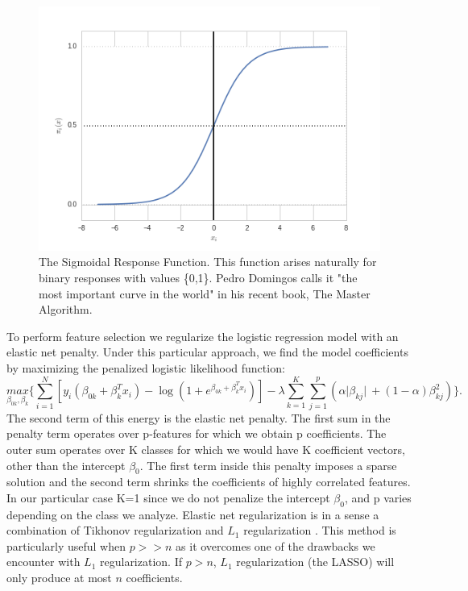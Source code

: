 \documentclass[12pt,a4paper]{article}
\begin{document}
\begin{figure}[ht!]
\begin{center}
\includegraphics[scale=.75]{sigmoid.png}
\caption{The Sigmoidal Response Function. This function arises naturally for binary responses with values \{0,1\}. Pedro Domingos calls it "the most important curve in the world" in his recent book, The Master Algorithm.}
\label{fig:1}
\end{center}
\end{figure}
To perform feature selection we regularize the logistic regression model with an elastic net penalty. Under this particular approach, we find the model coefficients by maximizing the penalized logistic likelihood function:
\begin{equation} \label{eq:7}
\underset{\beta_{0k},\beta_k}{max} \Biggr\{\sum_{i=1}^N 
\left[ y_i\left( \beta_{0k}+\beta_k^T x_i \right) -\log \left( 1 + e^{\beta_{0k} + \beta_k^T x_i} \right) \right]-\lambda \sum_{k = 1}^K \sum_{j = 1}^p \left(\alpha\vert\beta_{kj}\vert\ +  \left(1-\alpha\right)\beta_{kj}^2\right) \Biggr\}.
\end{equation}
The second term of this energy is the elastic net penalty. The first sum in the penalty term operates over p-features for which we obtain p coefficients. The outer sum operates over K classes for which we would have K coefficient vectors, other than the intercept $\beta_0$. The first term inside this penalty imposes a sparse solution and the second term shrinks the coefficients of highly correlated features. In our particular case K=1 since we do not penalize the intercept $\beta_0$, and p varies depending on the class we analyze. Elastic net regularization is in a sense a combination of Tikhonov regularization \cite{tikhonov1963solution} and $L_1$ regularization \cite{tibshirani1996regression}. This method is particularly useful when $p>>n$ as it overcomes one of the drawbacks we encounter with $L_1$ regularization. If $p>n$, $L_1$ regularization (the LASSO) will only produce at most $n$ coefficients.
\end{document}
